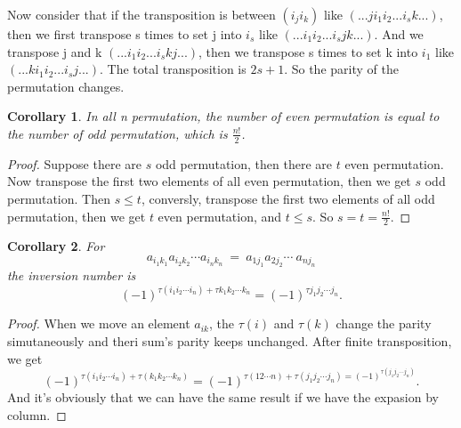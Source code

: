 \documentclass{article}
\newtheorem{corollary}{Corollary}[theorem]
\theoremstyle{definition}
\begin{document}
Now consider that if the transposition is between $(i_{j}i_{k})$ like 
$(...ji_{1}i_{2}...i_{s}k...)$, 
then we first transpose s times to set j into $i_{s}$ like 
$(...i_{1}i_{2}...i_{s}jk...)$. 
And we transpose j and k 
$(...i_{1}i_{2}...i_{s}kj...)$, 
then we transpose s times to set k into $i_{1}$ like 
$(...ki_{1}i_{2}...i_{s}j...)$.
The total transposition is $2s+1$. 
So the parity of the permutation changes.

\begin{corollary}
In all n permutation, the number of even permutation 
is equal to the number of odd permutation, which is 
$\frac{n!}{2}$.
\end{corollary}

\begin{proof}
Suppose there are $s$ odd permutation, then there are
$t$ even permutation. Now transpose the first two elements 
of all even permutation, then we get $s$ odd permutation.
Then $s\leq t$, conversly, transpose the first two elements 
of all odd permutation, then we get $t$ even permutation, and 
$t\leq s$. So $s=t=\frac{n!}{2}$.
\end{proof}

\begin{corollary}
    For $$a_{i_{1}k_{1}}a_{i_{2}k_{2}}\cdots a_{i_{n}k_{n}}\ =\ a_{1j_{1}}a_{2j_{2}}\cdots\ a_{nj_{n}}$$
    the inversion number is 
    $$(-1)^{\tau(i_{1}i_{2}\cdots i_{n})+\tau k_{1}k_{2}\cdots k_{n}}=(-1)^{\tau j_{1}j_{2}\cdots j_{n}}.$$
\end{corollary}
\begin{proof}
    When we move an element $a_{ik}$, the $\tau(i)$ and $\tau(k)$ change the parity simutaneously and 
    theri sum's parity keeps unchanged.
    After finite transposition, we get 
    $$(-1)^{\tau(i_{1}i_{2}\cdots i_{n})+\tau (k_{1}k_{2}\cdots k_{n})}=(-1)^{\tau(12\cdots n)+\tau(j_{1}j_{2}\cdots j_{n})=(-1)^{\tau(j_{1}j_{2}\cdots j_{n})}}.$$
    And it's obviously that we can have the same result if we have the expasion by column.
\end{proof}
\end{document}
